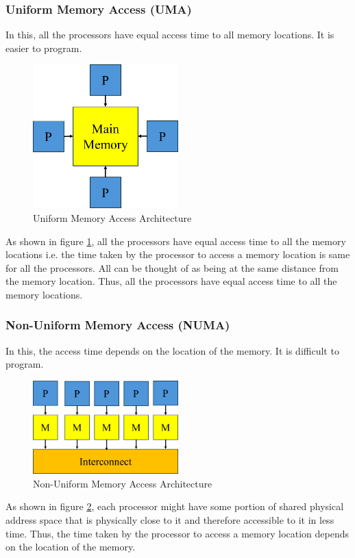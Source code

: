 \documentclass[12pt]{article}
\begin{document}
\subsubsection{Uniform Memory Access (UMA)}
In this, all the processors have equal access time to all memory locations. It is easier to program.
\begin{figure}[H]
    \centering
    \includegraphics[width=0.5\textwidth]{images/uma.png}
    \caption{Uniform Memory Access Architecture}
    \label{fig:uma}
\end{figure}
As shown in figure \ref{fig:uma}, all the processors have equal access time to all the memory locations i.e.
the time taken by the processor to access a memory location is same for all the processors. All can be thought of as being at 
the same distance from the memory location. Thus, all the processors have equal access time to all the memory locations.
\subsubsection{Non-Uniform Memory Access (NUMA)}
In this, the access time depends on the location of the memory. It is difficult to program.
\begin{figure}[H]
    \centering
    \includegraphics[width=0.5\textwidth]{images/numa.png}
    \caption{Non-Uniform Memory Access Architecture}
    \label{fig:numa}
\end{figure}
As shown in figure \ref{fig:numa}, each processor might have some portion of shared physical address space that is physically close to it and
therefore accessible to it in less time. Thus, the time taken by the processor to access a memory location depends on the location of the memory.
\end{document}
